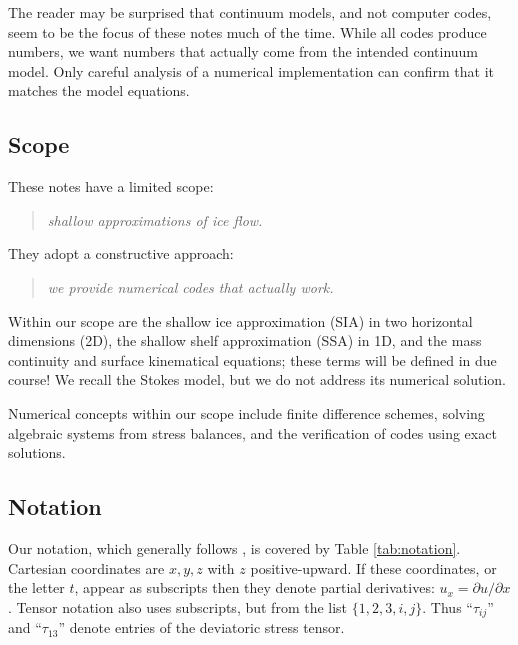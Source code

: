 \documentclass[letterpaper,final,12pt,reqno]{amsart}
\begin{document}
The reader may be surprised that continuum models, and not computer codes, seem to be the focus of these notes much of the time.  While all codes produce numbers, we want numbers that actually come from the intended continuum model.  Only careful analysis of a numerical implementation can confirm that it matches the model equations.

\subsection*{Scope}  These notes have a limited scope:
  \begin{quote}\emph{shallow approximations of ice flow.}\end{quote}
They adopt a constructive approach:
  \begin{quote}\emph{we provide numerical codes that actually work.}\end{quote}
Within our scope are the shallow ice approximation (SIA) in two horizontal dimensions (2D), the shallow shelf approximation (SSA) in 1D, and the mass continuity and surface kinematical equations; these terms will be defined in due course!  We recall the Stokes model, but we do not address its numerical solution.

Numerical concepts within our scope include finite difference schemes, solving algebraic systems from stress balances, and the verification of codes using exact solutions.

\subsection*{Notation}  Our notation, which generally follows \cite{GreveBlatter2009}, is covered by Table \ref{tab:notation}.  Cartesian coordinates are $x,y,z$ with $z$ positive-upward.  If these coordinates, or the letter $t$, appear as subscripts then they denote partial derivatives: $u_x = \partial u/\partial x$.  Tensor notation also uses subscripts, but from the list $\{1,2,3,i,j\}$.  Thus ``$\tau_{ij}$'' and ``$\tau_{13}$'' denote entries of the deviatoric stress tensor.
\end{document}
